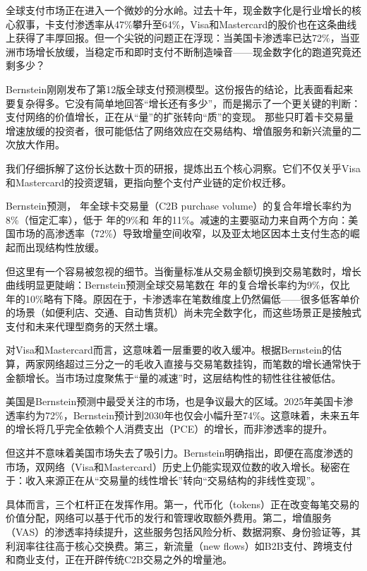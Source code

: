 \documentclass[11pt]{ctexart}
\begin{document}
全球支付市场正在进入一个微妙的分水岭。过去十年，现金数字化是行业增长的核心叙事，卡支付渗透率从47\%攀升至64\%，Visa和Mastercard的股价也在这条曲线上获得了丰厚回报。但一个尖锐的问题正在浮现：当美国卡渗透率已达72\%，当亚洲市场增长放缓，当稳定币和即时支付不断制造噪音——现金数字化的跑道究竟还剩多少？

Bernstein刚刚发布了第12版全球支付预测模型。这份报告的结论，比表面看起来要复杂得多。它没有简单地回答“增长还有多少”，而是揭示了一个更关键的判断：支付网络的价值增长，正在从“量”的扩张转向“质”的变现。 那些只盯着卡交易量增速放缓的投资者，很可能低估了网络效应在交易结构、增值服务和新兴流量的二次放大作用。

我们仔细拆解了这份长达数十页的研报，提炼出五个核心洞察。它们不仅关乎Visa和Mastercard的投资逻辑，更指向整个支付产业链的定价权迁移。

Bernstein预测， 年全球卡交易量（C2B purchase volume）的复合年增长率约为8\%（恒定汇率），低于 年的9\%和 年的11\%。减速的主要驱动力来自两个方向：美国市场的高渗透率（72\%）导致增量空间收窄，以及亚太地区因本土支付生态的崛起而出现结构性放缓。

但这里有一个容易被忽视的细节。当衡量标准从交易金额切换到交易笔数时，增长曲线明显更陡峭：Bernstein预测全球交易笔数在 年的复合增长率约为9\%，仅比 年的10\%略有下降。原因在于，卡渗透率在笔数维度上仍然偏低——很多低客单价的场景（如便利店、交通、自动售货机）尚未完全数字化，而这些场景正是接触式支付和未来代理型商务的天然土壤。

对Visa和Mastercard而言，这意味着一层重要的收入缓冲。根据Bernstein的估算，两家网络超过三分之一的毛收入直接与交易笔数挂钩，而笔数的增长通常快于金额增长。当市场过度聚焦于“量的减速”时，这层结构性的韧性往往被低估。

美国是Bernstein预测中最受关注的市场，也是争议最大的区域。2025年美国卡渗透率约为72\%，Bernstein预计到2030年也仅会小幅升至74\%。这意味着，未来五年的增长将几乎完全依赖个人消费支出（PCE）的增长，而非渗透率的提升。

但这并不意味着美国市场失去了吸引力。Bernstein明确指出，即便在高度渗透的市场，双网络（Visa和Mastercard）历史上仍能实现双位数的收入增长。秘密在于：收入来源正在从“交易量的线性增长”转向“交易结构的非线性变现”。

具体而言，三个杠杆正在发挥作用。第一，代币化（tokens）正在改变每笔交易的价值分配，网络可以基于代币的发行和管理收取额外费用。第二，增值服务（VAS）的渗透率持续提升，这些服务包括风险分析、数据洞察、身份验证等，其利润率往往高于核心交换费。第三，新流量（new flows）如B2B支付、跨境支付和商业支付，正在开辟传统C2B交易之外的增量池。
\end{document}
